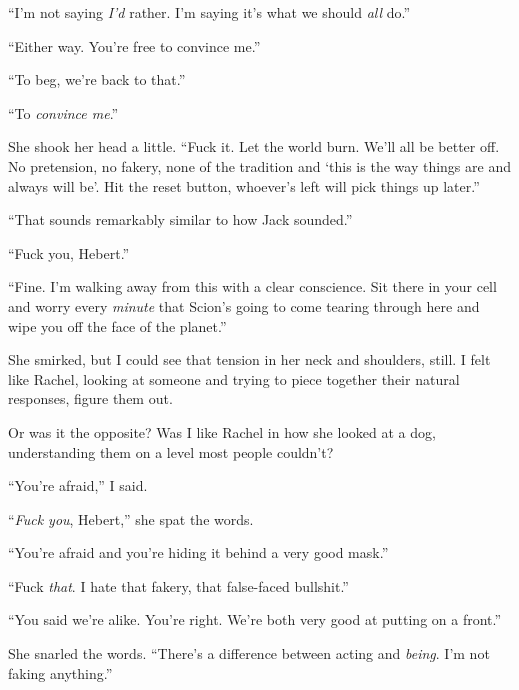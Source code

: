 ``I'm not saying \emph{I'd} rather.  I'm saying it's what we should \emph{all} do.''



``Either way.  You're free to convince me.''



``To beg, we're back to that.''



``To \emph{convince me}.''



She shook her head a little.  ``Fuck it.  Let the world burn.  We'll all be better off.  No pretension, no fakery, none of the tradition and `this is the way things are and always will be'.  Hit the reset button, whoever's left will pick things up later.''



``That sounds remarkably similar to how Jack sounded.''



``Fuck you, Hebert.''



``Fine.  I'm walking away from this with a clear conscience.  Sit there in your cell and worry every \emph{minute} that Scion's going to come tearing through here and wipe you off the face of the planet.''



She smirked, but I could see that tension in her neck and shoulders, still.  I felt like Rachel, looking at someone and trying to piece together their natural responses, figure them out.



Or was it the opposite?  Was I like Rachel in how she looked at a dog, understanding them on a level most people couldn't?



``You're afraid,'' I said.



``\emph{Fuck you}, Hebert,'' she spat the words.



``You're afraid and you're hiding it behind a very good mask.''



``Fuck \emph{that}.  I hate that fakery, that false-faced bullshit.''



``You said we're alike.  You're right.  We're both very good at putting on a front.''



She snarled the words.  ``There's a difference between acting and \emph{being}.  I'm not faking anything.''



